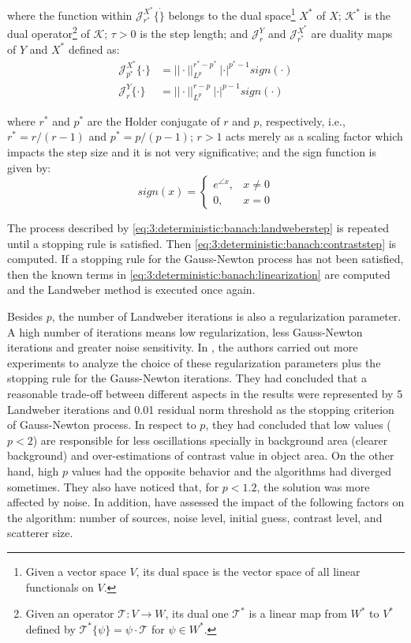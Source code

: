 			\noindent where the function within $\mathcal{J}^{X^*}_{r^*}\{\dot\}$ belongs to the dual space\footnote{Given a vector space $V$, its dual space is the vector space of all linear functionals on $V$.} $X^*$ of $X$; $\mathcal{K}^*$ is the dual operator\footnote{Given an operator $\mathcal{T}:V\rightarrow W$, its dual one $\mathcal{T}^*$ is a linear map from $W^*$ to $V^*$ defined by $\mathcal{T}^*\{\psi\}=\psi\cdot\mathcal{T}$ for $\psi\in W^*$.} of $\mathcal{K}$; $\tau>0$ is the step length; and $\mathcal{J}^Y_r$ and $\mathcal{J}^{X^*}_{r^*}$ are duality maps of $Y$ and $X^*$ \citep{schopfer2006nonlinear} defined as:
			\begin{align}
				\mathcal{J}^{X^*}_{p^*}\{\cdot\} &= ||\cdot||^{r^*-p^*}_{L^p}~|\cdot|^{p^*-1} sign(\cdot) \label{eq:3:deterministic:banach:dualitymapx}\\
				\mathcal{J}^Y_r\{\cdot\} &= ||\cdot||^{r-p}_{L^p}~|\cdot|^{p-1} sign(\cdot) \label{eq:3:deterministic:banach:dualitymapy}
			\end{align}
		
			\noindent where $r^*$ and $p^*$ are the Holder conjugate of $r$ and $p$, respectively, i.e., $r^*=r/(r-1)$ and $p^*=p/(p-1)$; $r>1$ acts merely as a scaling factor which impacts the step size and it is not very significative; and the sign function is given by:
			\begin{equation}
				sign(x) = \begin{cases} e^{\angle x}, & x\neq0 \\ 0, &x=0 \end{cases}
			\end{equation}
		
			The process described by \eqref{eq:3:deterministic:banach:landweberstep} is repeated until a stopping rule is satisfied. Then \eqref{eq:3:deterministic:banach:contraststep} is computed. If a stopping rule for the Gauss-Newton process has not been satisfied, then the known terms in \eqref{eq:3:deterministic:banach:linearization} are computed and the Landweber method is executed once again.
			
			Besides $p$, the number of Landweber iterations is also a regularization parameter. A high number of iterations means low regularization, less Gauss-Newton iterations and greater noise sensitivity. In \cite{estatico2014numerical}, the authors carried out more experiments to analyze the choice of these regularization parameters plus the stopping rule for the Gauss-Newton iterations. They had concluded that a reasonable trade-off between different aspects in the results were represented by 5 Landweber iterations and 0.01 residual norm threshold as the stopping criterion of Gauss-Newton process. In respect to $p$, they had concluded that low values ($p<2$) are responsible for less oscillations specially in background area (clearer background) and over-estimations of contrast value in object area. On the other hand, high $p$ values had the opposite behavior and the algorithms had diverged sometimes. They also have noticed that, for $p<1.2$, the solution was more affected by noise. In addition, \cite{fedeli2015quantitative} have assessed the impact of the following factors on the algorithm: number of sources, noise level, initial guess, contrast level, and scatterer size.
			
